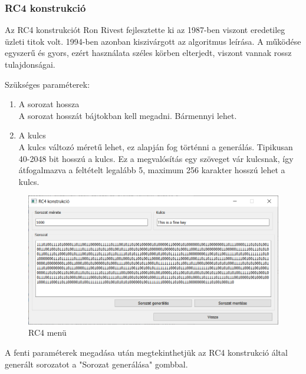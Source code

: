 \documentclass[12pt]{article}
\begin{document}
	\subsubsection{RC4 konstrukció}
	Az RC4 konstrukciót Ron Rivest fejlesztette ki az 1987-ben viszont eredetileg üzleti titok volt. 1994-ben azonban kiszivárgott az algoritmus leírása. \cite{rcleak} A működése egyszerű és gyors, ezért használata széles körben elterjedt, viszont vannak rossz tulajdonságai.
	\par
	Szükséges paraméterek:
	\begin{enumerate}
		\bfseries\item A sorozat hossza \\
		\normalfont A sorozat hosszát bájtokban kell megadni. Bármennyi lehet.
		\bfseries \item A kulcs
		\\
		\normalfont A kulcs változó méretű lehet, ez alapján fog történni a generálás. Tipikusan 40-2048 bit hosszú a kulcs. Ez a megvalósítás egy szöveget vár kulcsnak, így átfogalmazva a feltételt legalább 5, maximum 256 karakter hosszú lehet a kulcs.
	\end{enumerate}
	\begin{figure}[h]
		\centering
		\begin{minipage}{\textwidth} %
			\includegraphics[width=\textwidth]{RC4menu.png}
		\end{minipage}
		\caption{RC4 menü}
	\end{figure}
	A fenti paraméterek megadása után megtekinthetjük az RC4 konstrukció által generált sorozatot a "Sorozat generálása" gombbal.
\end{document}

